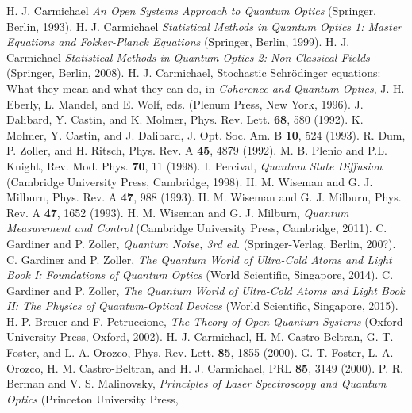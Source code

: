 \documentclass[twocolumn,aps,eqsecnum,showkeys,amsmath]{revtex4}
\begin{document}
\begin{references} 
%
 H. J. Carmichael \textit{An Open Systems
 Approach to Quantum Optics} (Springer, Berlin, 1993).
%
 H. J. Carmichael \textit{Statistical Methods in 
Quantum Optics 1: Master Equations and Fokker-Planck Equations} 
(Springer, Berlin, 1999). 
%
 H. J. Carmichael \textit{Statistical Methods in 
Quantum Optics 2: Non-Classical Fields} (Springer, Berlin, 2008). 
%
 H. J. Carmichael, Stochastic Schr\"odinger 
equations: What they mean and what they can do, in \textit{Coherence 
and Quantum  Optics}, J. H. Eberly, L. Mandel, and E. Wolf, eds. (Plenum 
Press, New York, 1996).
%
 J. Dalibard, Y. Castin, and K. Molmer, Phys. Rev. 
Lett. \textbf{68}, 580 (1992).
%
 K. Molmer, Y. Castin, and J. Dalibard, J. Opt. Soc. 
Am. B \textbf{10}, 524 (1993). 
%
 R. Dum, P. Zoller, and H. Ritsch, Phys. Rev. A 
\textbf{45}, 4879 (1992).
%
 M. B. Plenio and P.L. Knight, Rev. Mod. Phys. 
\textbf{70}, 11 (1998).
%
 I. Percival, \textit{Quantum State Diffusion}  
(Cambridge University Press, Cambridge, 1998). 
%
 H. M. Wiseman and G. J. Milburn, Phys. Rev. A 
\textbf{47}, 988 (1993).
%
 H. M. Wiseman and G. J. Milburn, Phys. Rev. A 
\textbf{47}, 1652 (1993).
%
 H. M. Wiseman and G. J. Milburn, \textit{Quantum 
Measurement and Control} (Cambridge University Press, Cambridge, 
2011). 
%
 C. Gardiner and P. Zoller, \textit{Quantum Noise, 
3rd ed.} (Springer-Verlag, Berlin, 200?). 
%
 C. Gardiner and P. Zoller, \textit{The Quantum World of 
Ultra-Cold Atoms and Light Book I: Foundations of Quantum Optics} 
(World Scientific, Singapore, 2014). 
%
 C. Gardiner and P. Zoller, \textit{The Quantum World 
of Ultra-Cold Atoms and Light Book II: The Physics of Quantum-Optical 
Devices} (World Scientific, Singapore, 2015).  
%
 H.-P. Breuer and F. Petruccione, \textit{The Theory of 
Open Quantum Systems} (Oxford University Press, Oxford, 2002). 
%
 H. J. Carmichael, H. M. Castro-Beltran, G. T. Foster, 
and L. A. Orozco, Phys. Rev. Lett. \textbf{85}, 1855 (2000).
%
 G. T. Foster, L. A. Orozco, H. M. Castro-Beltran, and 
	H. J. Carmichael, PRL \textbf{85}, 3149 (2000).
%
 P. R. Berman and V. S. Malinovsky, \textit{Principles 
of Laser Spectroscopy and Quantum Optics} (Princeton University Press, 

\end{references}
\end{document}
